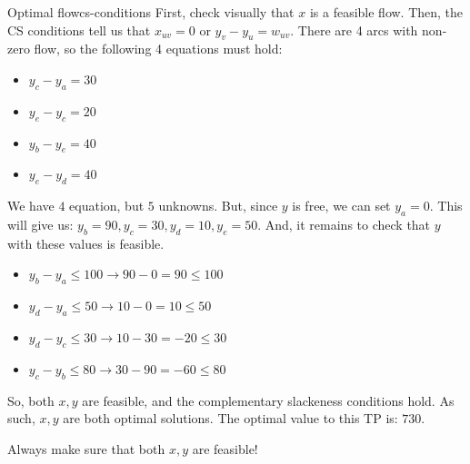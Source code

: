 \begin{example}{Optimal flow}{cs-conditions}
First, check visually that $x$ is a feasible flow. Then, the CS conditions tell us that $x_{uv} = 0$ or $y_v - y_u = w_{uv}$. There are 4 arcs with non-zero flow, so the following 4 equations must hold:
\begin{itemize}
  \item $y_c - y_a = 30$
  \item $y_e - y_c = 20$
  \item $y_b - y_e = 40$
  \item $y_e - y_d = 40$
\end{itemize}
We have $4$ equation, but $5$ unknowns. But, since $y$ is free, we can set $y_a = 0$. This will give us: $y_b = 90, y_c = 30, y_d = 10, y_e = 50$. And, it remains to check that $y$ with these values is feasible.
\begin{itemize}
  \item $y_b - y_a \leq 100 \longrightarrow 90 - 0 = 90 \leq 100$
  \item $y_d - y_a \leq 50 \longrightarrow 10 - 0 = 10 \leq 50$
  \item $y_d - y_c \leq 30 \longrightarrow 10 - 30 = -20 \leq 30$
  \item $y_c - y_b \leq 80 \longrightarrow 30 - 90 = -60 \leq 80$
\end{itemize}
So, both $x, y$ are feasible, and the complementary slackeness conditions hold. As such, $x, y$ are both optimal solutions. The optimal value to this TP is: $730$.
\end{example}
\begin{note} Always make sure that both $x,y$ are feasible! \end{note}
